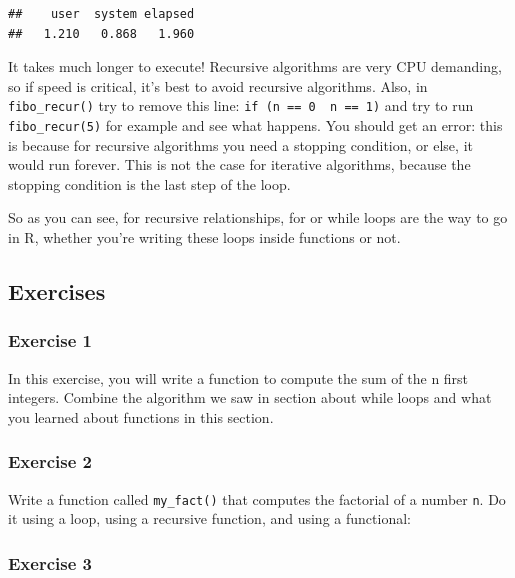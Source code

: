 \documentclass[]{gitbook}
\theoremstyle{definition}
\theoremstyle{definition}
\theoremstyle{definition}
\theoremstyle{remark}
\begin{document}
\begin{verbatim}
##    user  system elapsed 
##   1.210   0.868   1.960
\end{verbatim}

It takes much longer to execute! Recursive algorithms are very CPU
demanding, so if speed is critical, it's best to avoid recursive
algorithms. Also, in \texttt{fibo\_recur()} try to remove this line:
\texttt{if\ (n\ ==\ 0\ \textbar{}\textbar{}\ n\ ==\ 1)} and try to run
\texttt{fibo\_recur(5)} for example and see what happens. You should get
an error: this is because for recursive algorithms you need a stopping
condition, or else, it would run forever. This is not the case for
iterative algorithms, because the stopping condition is the last step of
the loop.

So as you can see, for recursive relationships, for or while loops are
the way to go in R, whether you're writing these loops inside functions
or not.

\hypertarget{exercises-4}{%
\subsection{Exercises}\label{exercises-4}}

\hypertarget{exercise-1-4}{%
\subsubsection*{Exercise 1}\label{exercise-1-4}}

In this exercise, you will write a function to compute the sum of the n
first integers. Combine the algorithm we saw in section about while
loops and what you learned about functions in this section.

\hypertarget{exercise-2-2}{%
\subsubsection*{Exercise 2}\label{exercise-2-2}}

Write a function called \texttt{my\_fact()} that computes the factorial
of a number \texttt{n}. Do it using a loop, using a recursive function,
and using a functional:

\hypertarget{exercise-3-2}{%
\subsubsection*{Exercise 3}\label{exercise-3-2}}
\end{document}
